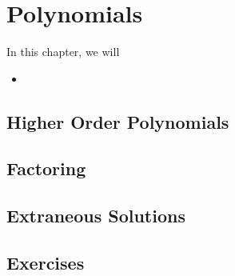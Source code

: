 
\chapter{Polynomials}

\begin{summary}
In this chapter, we will 
\begin{itemize}
    \item 
\end{itemize}
\end{summary}

\newpage 

\section{Higher Order Polynomials}

\section{Factoring}


\section{Extraneous Solutions}

\section{Exercises} 